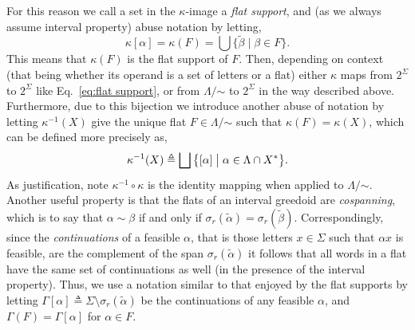 \documentclass[11pt]{article}
\newcommand{\univ}{\Sigma}
\newcommand{\glang}{\Lambda}
\begin{document}
For this reason we call a set in the $\kappa$-image a \emph{flat support}, and (as we always assume interval property) abuse notation by letting,
$$\kappa[\alpha] = \kappa(F) = \bigcup \{\widetilde{\beta}\mid \beta \in F\}.$$
This means that $\kappa(F)$ is the flat support of $F$.
Then, depending on context (that being whether its operand is a set of letters or a flat) either $\kappa$ maps from $2^\univ$ to $2^\univ$ like Eq.~\ref{eq:flat support}, or from $\glang/\mathord{\sim}$ to $2^\univ$ in the way described above.
Furthermore, due to this bijection we introduce another abuse of notation by letting $\kappa^{-1}(X)$ give the unique flat $F\in\glang/\mathord{\sim}$ such that $\kappa(F) = \kappa(X)$, which can be defined more precisely as,
\begin{equation}\label{eq:kappa-inv}
    \kappa^{-1}(X) \triangleq \bigsqcup \big\{[\alpha] \bigm\vert \alpha \in \glang\cap X^*\big\}.
\end{equation}
As justification, note $\kappa^{-1}\circ\kappa$ is the identity mapping when applied to $\glang/\mathord{\sim}$.
Another useful property is that the flats of an interval greedoid are \emph{cospanning}, which is to say that $\alpha \sim \beta$ if and only if $\sigma_r(\widetilde{\alpha}) = \sigma_r(\widetilde{\beta})$.
Correspondingly, since the \emph{continuations} of a feasible $\alpha$, that is those letters $x \in \univ$ such that $\alpha x$ is feasible, are the complement of the span $\sigma_r(\widetilde{\alpha})$ it follows that all words in a flat have the same set of continuations as well (in the presence of the interval property).
Thus, we use a notation similar to that enjoyed by the flat supports by letting $\Gamma[\alpha] \triangleq \univ\setminus\sigma_r(\widetilde{\alpha})$ be the continuations of any feasible $\alpha$, and $\Gamma(F) = \Gamma[\alpha]$ for $\alpha \in F$.
\end{document}
